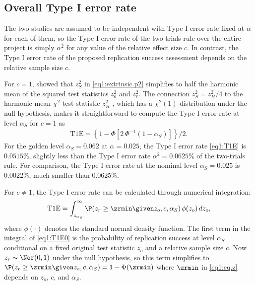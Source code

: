 \subsection{Overall Type I error rate}\label{sec1:T1E}
The two studies are assumed to be independent with Type I error rate fixed at
$\alpha$ for each of them, so the Type I error rate of the two-trials rule over
the entire project is simply $\alpha^2$ for any value of the relative effect
size $c$. In contrast, the Type I error rate of the proposed replication success
assessment {depends on} the relative sample size $c$.

For $c=1$, \citet[Section 3]{Held2020} showed that $z_S^2$ in
\eqref{eq1:extrinsic.p2} simplifies to half the harmonic mean of the squared test
statistics $z_o^2$ and $z_r^2$. The connection $z_S^2 = z_H^2/4$ to the harmonic
mean $\chi^2$-test statistic $z_H^2$ \citep{Held2020b}, which has a
$\chi^2(1)$-distribution under the null hypothesis, makes it straightforward to
compute the Type I error rate at level $\alpha_S$ for $c = 1$ as
\begin{eqnarray}\label{eq1:T1E}
\mbox{T1E} =   \left\{1-\Phi\left[2 \, \Phi^{-1}\left(1-\alpha_S \right)
 \right]\right\}/2.
\end{eqnarray}
For the golden level $\alpha_S =0.062$ at $\alpha = 0.025$, the Type I error
rate \eqref{eq1:T1E} is $0.0515$\%, slightly less than the Type I error rate
$\alpha^2=0.0625$\% of the two-trials rule. For comparison, the Type I error
rate at the nominal level $\alpha_S=0.025$ is $0.0022$\%, much smaller than
0.0625\%.


For $c \neq 1$, the Type I error rate can be calculated through numerical
integration:
\begin{equation}\label{eq1:T1E0}
  \mbox{T1E} = \int_{z_{\alpha_S}}^{\infty}
\P(z_r \geq \zrmin \given z_o, c, \alpha_S) \,
  \phi(z_o) \, dz_o,
\end{equation}
where $\phi(\cdot)$ denotes the standard normal density function. The first term
in the integral of \eqref{eq1:T1E0} is the probability of replication success at
level $\alpha_S$ conditional on a fixed original test statistic $z_o$ and a
relative sample size $c$. Now $z_r \sim \Nor(0,1)$ under the null hypothesis, so
this term simplifies to
$\P(z_r \geq \zrmin \given z_o, c, \alpha_S) = 1 - \Phi(\zrmin)$ where $\zrmin$
in \eqref{eq1:eq.z} depends on $z_o$, $c$, and $\alpha_S$.


